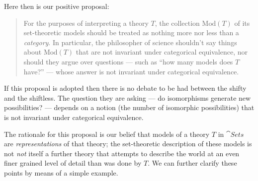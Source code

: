 Here then is our positive proposal:
\begin{quote} For the purposes of interpreting a theory $T$, the
  collection $\mathrm{Mod}(T)$ of its set-theoretic models should be
  treated as nothing more nor less than a {\it category}.  In
  particular, the philosopher of science shouldn't say things about
  $\mathrm{Mod}(T)$ that are not invariant under categorical
  equivalence, nor should they argue over questions --- such as ``how
  many models does $T$ have?'' --- whose answer is not invariant under
  categorical equivalence.  \end{quote} If this proposal is adopted
then there is no debate to be had between the shifty and the
shiftless.  The question they are asking --- do isomorphisms generate
new possibilities? --- depends on a notion (the number of isomorphic
possibilities) that is not invariant under categorical equivalence.

The rationale for this proposal is our belief that models of a theory
$T$ in $\cat{Sets}$ are {\it representations} of that theory; the
set-theoretic description of these models is not {\it not} itself a
further theory that attempts to describe the world at an even finer
grained level of detail than was done by $T$.  We can further clarify
these points by means of a simple example.

